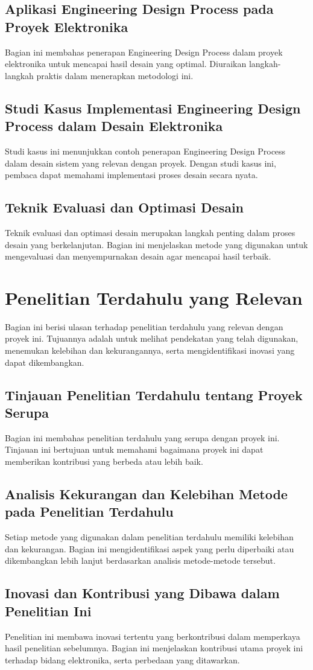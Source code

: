 \subsection{Aplikasi Engineering Design Process pada Proyek Elektronika}
Bagian ini membahas penerapan Engineering Design Process dalam proyek elektronika untuk mencapai hasil desain yang optimal. Diuraikan langkah-langkah praktis dalam menerapkan metodologi ini.

\subsection{Studi Kasus Implementasi Engineering Design Process dalam Desain Elektronika}
Studi kasus ini menunjukkan contoh penerapan Engineering Design Process dalam desain sistem yang relevan dengan proyek. Dengan studi kasus ini, pembaca dapat memahami implementasi proses desain secara nyata.

\subsection{Teknik Evaluasi dan Optimasi Desain}
Teknik evaluasi dan optimasi desain merupakan langkah penting dalam proses desain yang berkelanjutan. Bagian ini menjelaskan metode yang digunakan untuk mengevaluasi dan menyempurnakan desain agar mencapai hasil terbaik.

\section{Penelitian Terdahulu yang Relevan}
Bagian ini berisi ulasan terhadap penelitian terdahulu yang relevan dengan proyek ini. Tujuannya adalah untuk melihat pendekatan yang telah digunakan, menemukan kelebihan dan kekurangannya, serta mengidentifikasi inovasi yang dapat dikembangkan.

\subsection{Tinjauan Penelitian Terdahulu tentang Proyek Serupa}
Bagian ini membahas penelitian terdahulu yang serupa dengan proyek ini. Tinjauan ini bertujuan untuk memahami bagaimana proyek ini dapat memberikan kontribusi yang berbeda atau lebih baik.

\subsection{Analisis Kekurangan dan Kelebihan Metode pada Penelitian Terdahulu}
Setiap metode yang digunakan dalam penelitian terdahulu memiliki kelebihan dan kekurangan. Bagian ini mengidentifikasi aspek yang perlu diperbaiki atau dikembangkan lebih lanjut berdasarkan analisis metode-metode tersebut.

\subsection{Inovasi dan Kontribusi yang Dibawa dalam Penelitian Ini}
Penelitian ini membawa inovasi tertentu yang berkontribusi dalam memperkaya hasil penelitian sebelumnya. Bagian ini menjelaskan kontribusi utama proyek ini terhadap bidang elektronika, serta perbedaan yang ditawarkan.